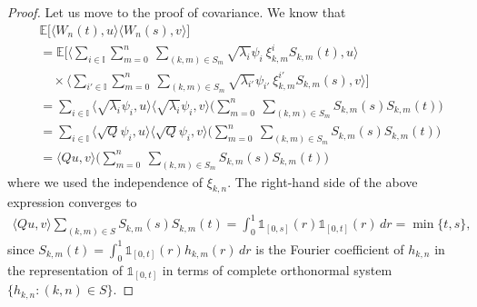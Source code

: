 \documentclass[english,a4paper,11pt]{amsart}
\theoremstyle{plain}
\theoremstyle{definition}
\theoremstyle{remark}
\numberwithin{equation}{section}
\newcommand{\EE}{ \mathbb{E} }
\begin{document}
\begin{appendix}
\begin{proof}
Let us move to the proof of covariance. We know that 
\begin{align*}
&	\mathbb{E}\Big[\langle W_n(t),u\rangle \langle W_n(s),v\rangle \Big]\\&=\EE \Bigg[ \Big\langle\sum_{i\in\mathbb{I}}\sum_{m=0}^{n}\ \sum_{(k,m)\in S_{m}}\sqrt{\lambda_i }\psi_i \ \xi_{k,m} ^iS_{k,m}(t),u\Big\rangle\\&\quad \times \Big\langle \sum_{i'\in\mathbb{I}}\sum_{m=0}^{n}\ \sum_{(k,m)\in S_{m}}\sqrt{\lambda_{i'} }\psi_{i'} \ \xi_{k,m}^{i'} S_{k,m}(s),v\Big\rangle\Bigg]
\\&=
\sum_{i\in\mathbb{I}}\langle\sqrt{\lambda_i }\psi_i ,u\rangle\langle \sqrt{\lambda_i }\psi_i ,v\rangle\Bigg(
\sum_{m=0}^{n}\ \sum_{(k,m)\in S_{m}} S_{k,m}(s) S_{k,m}(t)\Bigg)
\\&=
\sum_{i\in\mathbb{I}}\langle\sqrt{Q}\psi_i ,u\rangle\langle \sqrt{Q}\psi_i ,v\rangle\Bigg(
\sum_{m=0}^{n}\ \sum_{(k,m)\in S_{m}} S_{k,m}(s) S_{k,m}(t)\Bigg)
\\&=
\langle Qu,v\rangle\Bigg(
\sum_{m=0}^{n}\ \sum_{(k,m)\in S_{m}} S_{k,m}(s) S_{k,m}(t)\Bigg)
\end{align*}where we used the independence of $\xi_{k,n}$. The right-hand side of the above expression converges to 
\begin{align*}
	\langle Qu,v\rangle
 \sum_{(k,m)\in S} S_{k,m}(s) S_{k,m}(t)= \int_0^1 \mathds{1}_{[0,s]} (r)\mathds{1}_{[0,t]}(r)\, d r=\min\{t,s\},
\end{align*}since $\displaystyle S_{k,m}(t)=\int_0^1\mathds{1}_{[0,t]}(r)h_{k,m}(r)\, dr$ is the Fourier coefficient of $h_{k,n}$ in the representation of $\mathds{1}_{[0,t]}$ in terms of complete orthonormal system $\{h_{k,n}:(k,n)\in S\}$.
\end{proof}




\end{appendix}
\end{document}
